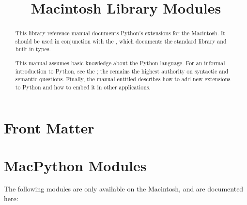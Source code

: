 \documentclass{manual}
\title{Macintosh Library Modules}
\begin{document}
\maketitle

\ifhtml
\chapter*{Front Matter\label{front}}
\fi



\begin{abstract}

\noindent
This library reference manual documents Python's extensions for the
Macintosh.  It should be used in conjunction with the
, which documents
the standard library and built-in types.

This manual assumes basic knowledge about the Python language.  For an
informal introduction to Python, see the
; the
 remains the
highest authority on syntactic and semantic questions.  Finally, the
manual entitled  describes how to add new extensions to Python
and how to embed it in other applications.

\end{abstract}

\tableofcontents




\chapter{MacPython Modules \label{macpython-modules}}

The following modules are only available on the Macintosh, and are
documented here:

\localmoduletable



%















%
%

\renewcommand{\indexname}{Module Index}

\renewcommand{\indexname}{Index}
\end{document}
